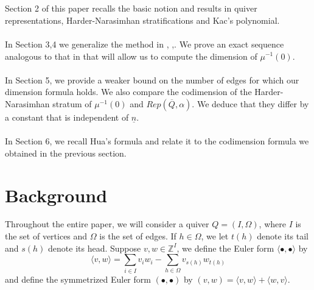 \documentclass[12pt]{amsart}
\theoremstyle{plain}
\theoremstyle{definition}
\theoremstyle{remark}
\begin{document}
\\~\\ Section 2 of this paper recalls the basic notion and results in quiver representations, Harder-Narasimhan stratifications and Kac's polynomial. 
\\~\\ In Section 3,4 we generalize the method in \cite{crawley1998noncommutative}, \cite{crawley2001geometry},\cite{reineke2003hn}. We prove an exact sequence analogous to that in \cite[Section 3]{crawley2001geometry} that will allow us to compute the dimension of $\mu^{-1}(0)$.
\\~\\ In Section 5, we provide a weaker bound on the number of edges for which our dimension formula holds. We also compare the codimension of the Harder-Narasimhan stratum of $\mu^{-1}(0)$ and $Rep(\overline{Q},\alpha)$. We deduce that they differ by a constant that is independent of $\underline{n}$.
\\~\\ In Section 6, we recall Hua's formula and relate it to the codimension formula we obtained in the previous section.
\section{Background}
\hspace{-13pt}Throughout the entire paper, we will consider a quiver $Q=(I,\Omega)$, where $I$ is the set of vertices and $\Omega$ is the set of edges. If $h\in\Omega$, we let $t(h)$ denote its tail and $s(h)$ denote its head. Suppose $v,w\in\mathbb Z^I$, we define the Euler form $\langle\bullet,\bullet\rangle$ by
$$\langle v,w\rangle=\sum_{i\in I}v_iw_i-\sum_{h\in\Omega}v_{s(h)}w_{t(h)}$$
and define the symmetrized Euler form $(\bullet,\bullet)$ by $(v,w)=\langle v,w\rangle+\langle w,v\rangle$.
\end{document}
